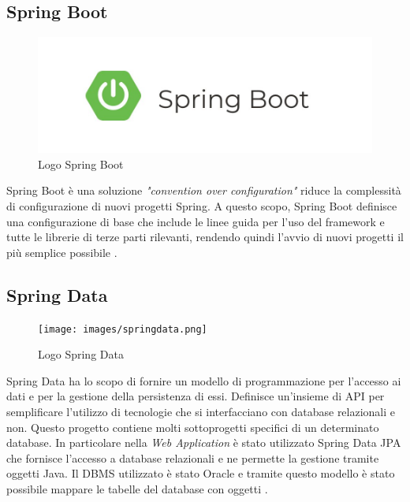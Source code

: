 \subsection{Spring Boot}
\begin{figure}
\begin{center}
\includegraphics[width=0.8\columnwidth]{images/springbootlogo.jpg}
\end{center}
\caption{Logo Spring Boot}
\label{fig:springboot}
\end{figure}

Spring Boot è una soluzione \textit{"convention over configuration"} riduce la complessità di configurazione di nuovi progetti Spring. A questo scopo, Spring Boot definisce una configurazione di base che include le linee guida per l'uso del \gls{framework} e tutte le librerie di terze parti rilevanti, rendendo quindi l'avvio di nuovi progetti il più semplice possibile \cite{springboot}.


\subsection{Spring Data}
\begin{figure}
\begin{center}
\texttt{[image: images/springdata.png]}
\end{center}
\caption{Logo Spring Data}
\label{fig:springdata}
\end{figure}
Spring Data ha lo scopo di fornire un modello di programmazione per l'accesso ai dati e per la gestione della persistenza di essi. Definisce un’insieme di \gls{API} per semplificare l'utilizzo di tecnologie che si interfacciano con database relazionali e non. Questo progetto contiene molti sottoprogetti specifici di un determinato database. In particolare nella \textit{Web Application } è stato utilizzato Spring Data JPA che 
fornisce l’accesso a database relazionali e ne permette la gestione tramite oggetti Java.
Il \gls{DBMS} utilizzato è stato Oracle e tramite questo modello è stato possibile mappare le tabelle del database con oggetti \cite{springdata}.

\clearpage

